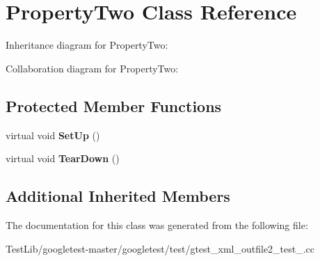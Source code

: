 \hypertarget{classPropertyTwo}{}\section{Property\+Two Class Reference}
\label{classPropertyTwo}


Inheritance diagram for Property\+Two\+:


Collaboration diagram for Property\+Two\+:
\subsection*{Protected Member Functions}
\begin{DoxyCompactItemize}
\item 
\mbox{\label{classPropertyTwo_aa3ab39cf4e6c751cb0788c575bf92ca2}} 
virtual void {\bfseries Set\+Up} ()
\item 
\mbox{\label{classPropertyTwo_aa4ffb2b9dddeba69f0f9baf133f06ef2}} 
virtual void {\bfseries Tear\+Down} ()
\end{DoxyCompactItemize}
\subsection*{Additional Inherited Members}


The documentation for this class was generated from the following file\+:\begin{DoxyCompactItemize}
\item 
Test\+Lib/googletest-\/master/googletest/test/gtest\+\_\+xml\+\_\+outfile2\+\_\+test\+\_\+.\+cc\end{DoxyCompactItemize}
